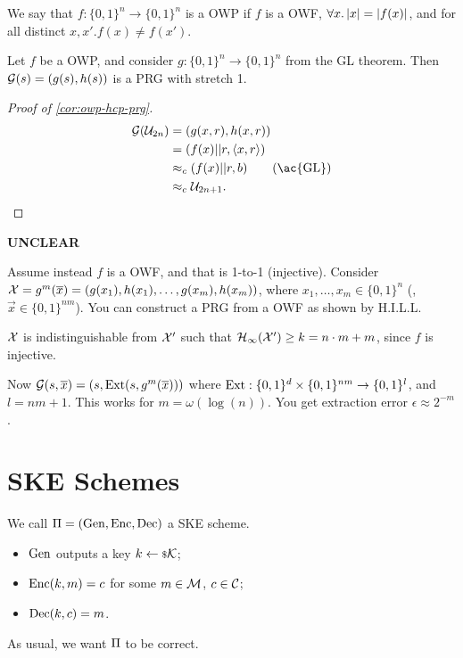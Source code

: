 \begin{definition}
	We say that $f : \{0,1\}^n \to \{0,1\}^{n}$ is a \ac{OWP} if $f$ is a \ac{OWF}, $\forall x . \left|{x}\right| = \left|{f(x)}\right|$, and for all distinct $x, x' . f(x) \neq f(x')$.
\end{definition}

\begin{corollary} \label{cor:owp-hcp-prg}
	Let $f$ be a \ac{OWP}, and consider $g : \{0,1\}^n \to \{0,1\}^{n}$ from the \ac{GL} theorem.
	Then $\mathcal{G}(s) = (g(s), h(s))$ is a \ac{PRG} with stretch 1.
\end{corollary}

\begin{proof}[Proof of \cref{cor:owp-hcp-prg}]
	\begin{align*}
		\G(\U_{2n})
		& =
		(g(x,r), h(x,r)) \\
		& =
		(f(x) || r, \DotProduct{x}{r}) \\
		& \CompInd 
		(f(x) || r, b) \tag{\ac{GL}}
		\\
		& \CompInd
		\U_{2n+1}.
	\end{align*}
\end{proof}


\begin{framed}
{\bfseries UNCLEAR}

Assume instead $f$ is a \ac{OWF}, and that is 1-to-1 (injective).
Consider $\mathcal{X} = g^m(\overline{x}) = (g(x_1), h(x_1), \dots, g(x_m), h(x_m))$, where $x_1, \dots, x_m \in \{0,1\}^{n}$ (\ie, $\vec{x} \in \{0,1\}^{nm}$).
You can construct a \ac{PRG} from a \ac{OWF} as shown by H.I.L.L.

\begin{fact}
$\mathcal{X}$ is indistinguishable from $\mathcal{X}'$ such that $\mathcal{H}_{\infty}(\mathcal{X}') \ge k = n \cdot m + m$, since $f$ is injective.
\end{fact}

Now $\mathcal{G}(s, \overline{x}) = (s, \mathrm{Ext}(s, g^{m}(\overline{x})))$ where $\mathrm{Ext} : \{0,1\}^{d} \times \{0,1\}^{nm} \to \{0,1\}^{l}$, and $l = nm + 1$.
This works for $m = \omega(\log(n))$.
You get extraction error $\epsilon \approx 2^{-m}$.
\end{framed}

\section{\acl{SKE} Schemes}

We call $\Pi = \left( \mathrm{Gen} , \allowbreak \mathrm{Enc} , \allowbreak \mathrm{Dec} \right)$ a \ac{SKE} scheme.
\begin{itemize}
	\item $\mathrm{Gen}$ outputs a key $k \leftarrow {\scriptstyle \$} {\mathcal{K}}$;
	\item $\mathrm{Enc}(k, m) = c$ for some $m \in \mathcal{M}$, $c \in \mathcal{C}$;
	\item $\mathrm{Dec}(k, c) = m$.
\end{itemize}
As usual, we want $\Pi$ to be correct.


